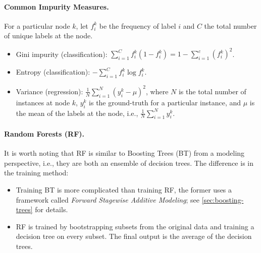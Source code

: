     \paragraph{Common Impurity Measures.}
    For a particular node $k$, let $f^k_i$ be the frequency of label $i$ and $C$ the total number of unique labels at the node.
    \begin{itemize}
        \item Gini impurity (classification): $\sum_{i=1}^{C}{f^k_i (1 - f^k_i)} = 1 - \sum_{i=1}^{c}{(f_i^k)^2}$.
        \item Entropy (classification): $-\sum_{i=1}^{C}{f^k_i \log f^k_i}$.
        \item Variance (regression): $\frac{1}{N}\sum_{i=1}^{N}{(y^k_i - \mu)^2}$, where $N$ is the total number of instances at node $k$, $y^k_i$ is the ground-truth for a particular instance, and $\mu$ is the mean of the labels at the node, i.e., $\frac{1}{N}\sum_{i=1}^{N}{y^k_i}$.
    \end{itemize}
    
    
    
    \paragraph{Random Forests (RF).} It is worth noting that RF is similar to Boosting Trees (BT) from a modeling perspective, i.e., they are both an ensemble of decision trees.
    The difference is in the training method:
        \begin{itemize}
            \item Training BT is more complicated than training RF, the former uses a framework called \emph{Forward Stagewise Additive Modeling}; see \ref{sec:boosting-trees} for details.
            \item RF is trained by bootstrapping subsets from the original data and training a decision tree on every subset. 
            The final output is the average of the decision trees.
        \end{itemize}



